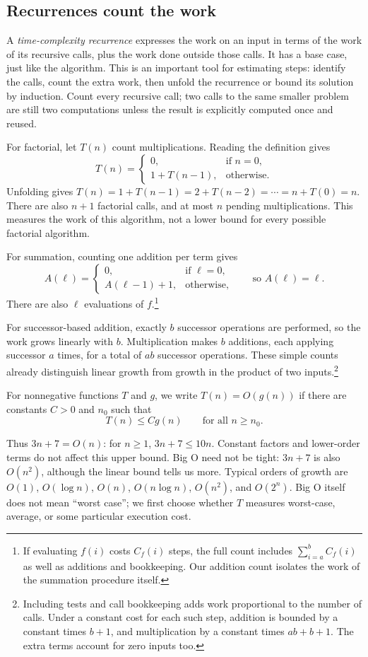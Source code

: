 \subsection{Recurrences count the work}

A \emph{time-complexity recurrence} expresses the work on an input in terms
of the work of its recursive calls, plus the work done outside those calls.
It has a base case, just like the algorithm. This is an important tool for
estimating steps: identify the calls, count the extra work, then unfold the
recurrence or bound its solution by induction. Count every recursive call;
two calls to the same smaller problem are still two computations unless
the result is explicitly computed once and reused.

For factorial, let $T(n)$ count multiplications. Reading the definition gives
\[
T(n)=\begin{cases}
0,&\text{if }n=0,\\
1+T(n-1),&\text{otherwise}.
\end{cases}
\]
Unfolding gives $T(n)=1+T(n-1)=2+T(n-2)=\cdots=n+T(0)=n$.
There are also $n+1$ factorial calls, and at most $n$ pending multiplications.
This measures the work of this algorithm, not a lower bound for every
possible factorial algorithm.

For summation, counting one addition per term gives
\[
A(\ell)=\begin{cases}
0,&\text{if }\ell=0,\\
A(\ell-1)+1,&\text{otherwise},
\end{cases}
\qquad\text{so }A(\ell)=\ell.
\]
There are also $\ell$ evaluations of $f$.\footnote{If evaluating $f(i)$
costs $C_f(i)$ steps, the full count includes $\sum_{i=a}^{b}C_f(i)$ as
well as additions and bookkeeping. Our addition count isolates the work
of the summation procedure itself.}

For successor-based addition, exactly $b$ successor operations are performed,
so the work grows linearly with $b$. Multiplication makes $b$ additions,
each applying successor $a$ times, for a total of $ab$ successor operations.
These simple counts already distinguish linear growth from growth in the
product of two inputs.\footnote{Including tests and call bookkeeping adds
work proportional to the number of calls. Under a constant cost for each
such step, addition is bounded by a constant times $b+1$, and multiplication
by a constant times $ab+b+1$. The extra terms account for zero inputs too.}

\begin{definition}[Big O]
For nonnegative functions $T$ and $g$, we write $T(n)=O(g(n))$ if there are
constants $C>0$ and $n_0$ such that
\[
T(n)\leq Cg(n)\qquad\text{for all }n\geq n_0.
\]
\end{definition}
Thus $3n+7=O(n)$: for $n\geq1$, $3n+7\leq10n$. Constant factors and
lower-order terms do not affect this upper bound. Big O need not be tight:
$3n+7$ is also $O(n^2)$, although the linear bound tells us more. Typical
orders of growth are $O(1)$, $O(\log n)$, $O(n)$, $O(n\log n)$, $O(n^2)$, and $O(2^n)$.
Big O itself does not mean ``worst case''; we first choose whether $T$
measures worst-case, average, or some particular execution cost.

